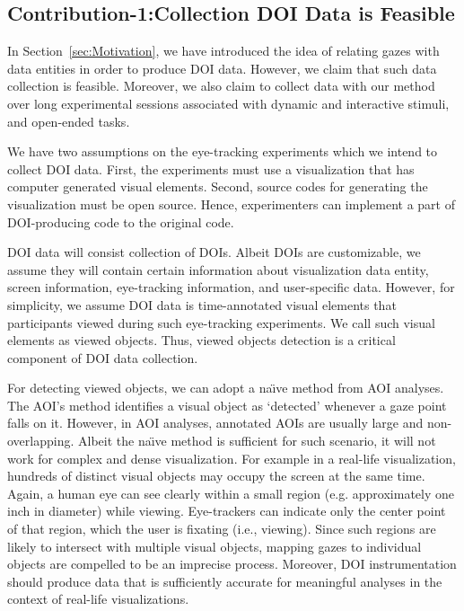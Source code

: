 \subsection{Contribution-1:Collection DOI Data is Feasible}
\label{sec:Contribution-1}
In Section~\ref{sec:Motivation}, we have introduced the idea of relating gazes with data entities in order to produce DOI data. However, we claim that such data collection is feasible. Moreover, we also claim to collect data with our method over long experimental sessions associated with dynamic and interactive stimuli, and open-ended tasks. 

We have two assumptions on the eye-tracking experiments which we intend to collect DOI data. First, the experiments must use a visualization that has computer generated visual elements. Second, source codes for generating the visualization must be open source. Hence, experimenters can implement a part of DOI-producing code to the original code. 

DOI data will consist collection of DOIs. Albeit DOIs are customizable, we assume they will contain certain information about visualization data entity, screen information, eye-tracking information, and user-specific data. However, for simplicity, we assume DOI data is time-annotated visual elements that participants viewed during such eye-tracking experiments. We call such visual elements as viewed objects. Thus, viewed objects detection is a critical component of DOI data collection.

For detecting viewed objects, we can adopt a na\"{\i}ve method from AOI analyses. The AOI's method identifies a visual object as `detected' whenever a gaze point falls on it. However, in AOI analyses, annotated AOIs are usually large and non-overlapping. Albeit the na\"{\i}ve method is sufficient for such scenario, it will not work for complex and dense visualization. For example in a real-life visualization, hundreds of distinct visual objects may occupy the screen at the same time. Again, a human eye can see clearly within a small region (e.g. approximately one inch in diameter) while viewing. Eye-trackers can indicate only the center point of that region, which the user is fixating (i.e., viewing). Since such regions are likely to intersect with multiple visual objects, mapping gazes to individual objects are compelled to be an imprecise process. Moreover, DOI instrumentation should produce data that is sufficiently accurate for meaningful analyses in the context of real-life visualizations.

